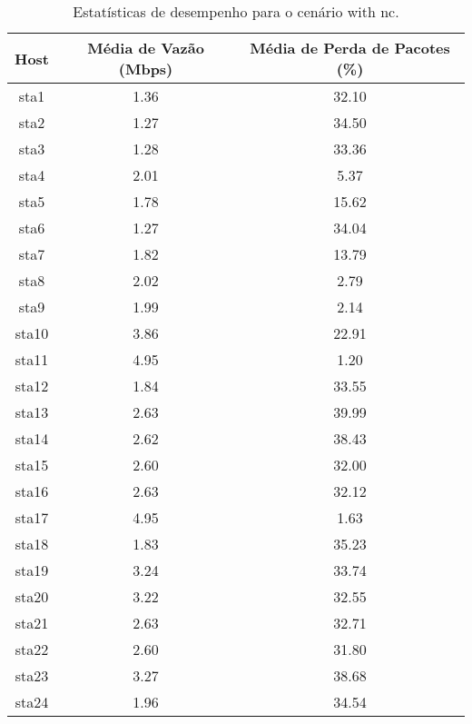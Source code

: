 \begin{table}[htbp]
    \centering
    \label{tab:with_nc_stats}
    \begin{tabular}{|c|c|c|}
        \hline
        \textbf{Host} & \textbf{Média de Vazão (Mbps)} & \textbf{Média de Perda de Pacotes (\%)} \\ \hline
        sta1 & 1.36 & 32.10 \\ \hline
        sta2 & 1.27 & 34.50 \\ \hline
        sta3 & 1.28 & 33.36 \\ \hline
        sta4 & 2.01 & 5.37 \\ \hline
        sta5 & 1.78 & 15.62 \\ \hline
        sta6 & 1.27 & 34.04 \\ \hline
        sta7 & 1.82 & 13.79 \\ \hline
        sta8 & 2.02 & 2.79 \\ \hline
        sta9 & 1.99 & 2.14 \\ \hline
        sta10 & 3.86 & 22.91 \\ \hline
        sta11 & 4.95 & 1.20 \\ \hline
        sta12 & 1.84 & 33.55 \\ \hline
        sta13 & 2.63 & 39.99 \\ \hline
        sta14 & 2.62 & 38.43 \\ \hline
        sta15 & 2.60 & 32.00 \\ \hline
        sta16 & 2.63 & 32.12 \\ \hline
        sta17 & 4.95 & 1.63 \\ \hline
        sta18 & 1.83 & 35.23 \\ \hline
        sta19 & 3.24 & 33.74 \\ \hline
        sta20 & 3.22 & 32.55 \\ \hline
        sta21 & 2.63 & 32.71 \\ \hline
        sta22 & 2.60 & 31.80 \\ \hline
        sta23 & 3.27 & 38.68 \\ \hline
        sta24 & 1.96 & 34.54 \\ \hline
    \end{tabular}
    \caption{Estatísticas de desempenho para o cenário with nc.}
\end{table}

